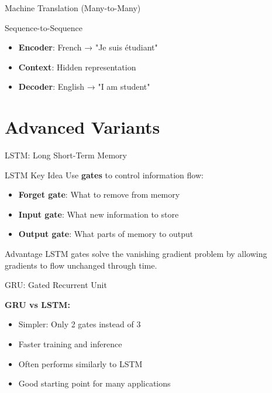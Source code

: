 \documentclass[usenames,dvipsnames]{beamer}
\begin{document}
	\begin{frame}{Machine Translation (Many-to-Many)}
		\begin{examplebox}{Sequence-to-Sequence}
			\begin{itemize}
				\item \textbf{Encoder}: French → "Je suis étudiant"
				\item \textbf{Context}: Hidden representation
				\item \textbf{Decoder}: English → "I am student"
			\end{itemize}
		\end{examplebox}
	\end{frame}
	
	\section{Advanced Variants}
	
	\begin{frame}{LSTM: Long Short-Term Memory}
		\begin{definitionbox}{LSTM Key Idea}
			Use \textbf{gates} to control information flow:
			\begin{itemize}
				\item \textbf{Forget gate}: What to remove from memory
				\item \textbf{Input gate}: What new information to store  
				\item \textbf{Output gate}: What parts of memory to output
			\end{itemize}
		\end{definitionbox}
		
		\begin{theorembox}{Advantage}
			LSTM gates solve the vanishing gradient problem by allowing gradients to flow unchanged through time.
		\end{theorembox}
	\end{frame}
	
	\begin{frame}{GRU: Gated Recurrent Unit}
		\begin{keypointsbox}
			\textbf{GRU vs LSTM:}
			\begin{itemize}
				\item Simpler: Only 2 gates instead of 3
				\item Faster training and inference
				\item Often performs similarly to LSTM
				\item Good starting point for many applications
			\end{itemize}
		\end{keypointsbox}
	\end{frame}
	
\end{document}
